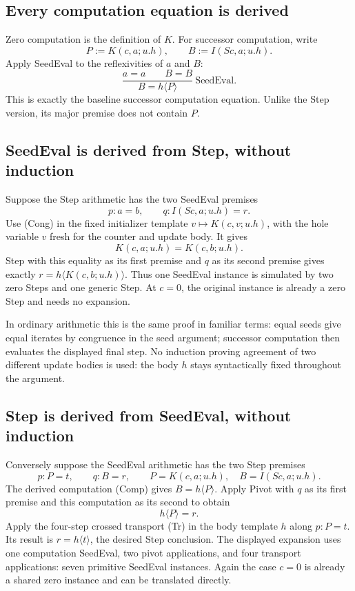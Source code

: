 \documentclass[11pt,letterpaper]{article}
\begin{document}
\subsection{Every computation equation is derived}

Zero computation is the definition of $K$.  For successor computation,
write
\[
                 P:=K(c,a;u.h),\qquad B:=I(Sc,a;u.h).
\]
Apply SeedEval to the reflexivities of $a$ and $B$:
\[
                  \frac{a=a\qquad B=B}{B=h\langle P\rangle}
                         \ \mathrm{SeedEval}.
 \tag{Comp}
\]
This is exactly the baseline successor computation equation.  Unlike
the Step version, its major premise does not contain $P$.

\subsection{SeedEval is derived from Step, without induction}

Suppose the Step arithmetic has the two SeedEval premises
\[
                     p:a=b,\qquad q:I(Sc,a;u.h)=r.
\]
Use (Cong) in the fixed initializer template
$v\mapsto K(c,v;u.h)$, with the hole variable $v$ fresh for the
counter and update body.  It gives
\[
                     K(c,a;u.h)=K(c,b;u.h).
\]
Step with this equality as its first premise and $q$ as its second
premise gives exactly
$r=h\langle K(c,b;u.h)\rangle$.
Thus one SeedEval instance is simulated by two zero Steps and one generic
Step.  At $c=0$, the original instance is already a zero Step and needs
no expansion.

In ordinary arithmetic this is the same proof in familiar terms:
equal seeds give equal iterates by congruence in the seed argument;
successor computation then evaluates the displayed final step.
No induction proving agreement of two different update bodies is used:
the body $h$ stays syntactically fixed throughout the argument.

\subsection{Step is derived from SeedEval, without induction}

Conversely suppose the SeedEval arithmetic has the two Step premises
\[
              p:P=t,\qquad q:B=r,
       \qquad P=K(c,a;u.h),\quad B=I(Sc,a;u.h).
\]
The derived computation (Comp) gives $B=h\langle P\rangle$.
Apply Pivot with $q$ as its first premise and this computation as its second to obtain
\[
                          h\langle P\rangle=r.
\]
Apply the four-step crossed transport (Tr) in the body template $h$
along $p:P=t$.  Its result is $r=h\langle t\rangle$, the desired
Step conclusion.  The displayed expansion uses one computation SeedEval,
two pivot applications, and four transport applications: seven primitive SeedEval
instances.  Again the case $c=0$ is already a shared zero instance
and can be translated directly.
\end{document}
